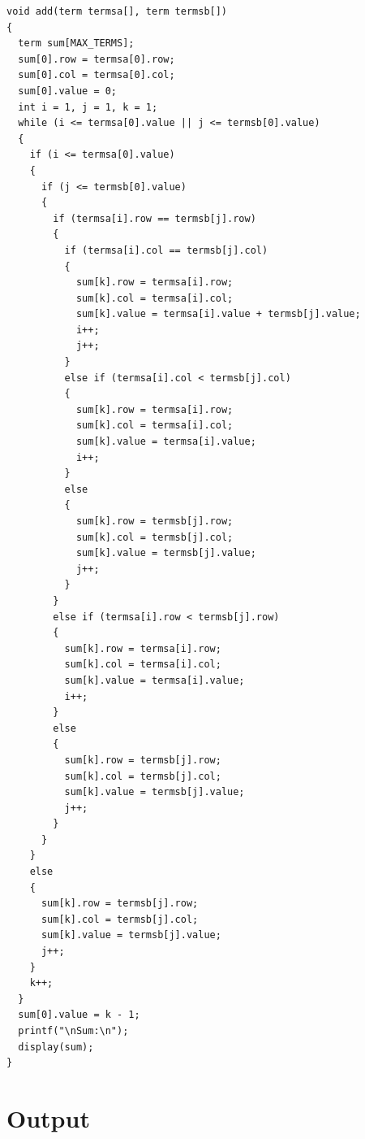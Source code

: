 \begin{lstlisting}[label={list:c_program:sparse_matrix}]
void add(term termsa[], term termsb[])
{
  term sum[MAX_TERMS];
  sum[0].row = termsa[0].row;
  sum[0].col = termsa[0].col;
  sum[0].value = 0;
  int i = 1, j = 1, k = 1;
  while (i <= termsa[0].value || j <= termsb[0].value)
  {
    if (i <= termsa[0].value)
    {
      if (j <= termsb[0].value)
      {
        if (termsa[i].row == termsb[j].row)
        {
          if (termsa[i].col == termsb[j].col)
          {
            sum[k].row = termsa[i].row;
            sum[k].col = termsa[i].col;
            sum[k].value = termsa[i].value + termsb[j].value;
            i++;
            j++;
          }
          else if (termsa[i].col < termsb[j].col)
          {
            sum[k].row = termsa[i].row;
            sum[k].col = termsa[i].col;
            sum[k].value = termsa[i].value;
            i++;
          }
          else
          {
            sum[k].row = termsb[j].row;
            sum[k].col = termsb[j].col;
            sum[k].value = termsb[j].value;
            j++;
          }
        }
        else if (termsa[i].row < termsb[j].row)
        {
          sum[k].row = termsa[i].row;
          sum[k].col = termsa[i].col;
          sum[k].value = termsa[i].value;
          i++;
        }
        else
        {
          sum[k].row = termsb[j].row;
          sum[k].col = termsb[j].col;
          sum[k].value = termsb[j].value;
          j++;
        }
      }
    }
    else
    {
      sum[k].row = termsb[j].row;
      sum[k].col = termsb[j].col;
      sum[k].value = termsb[j].value;
      j++;
    }
    k++;
  }
  sum[0].value = k - 1;
  printf("\nSum:\n");
  display(sum);
}
\end{lstlisting}

\section{Output}

